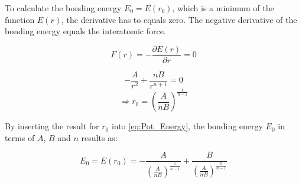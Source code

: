 To calculate the bonding energy $E_0 = E(r_0)$, which is a minimum of the function $E(r)$,
the derivative has to equals zero.
The negative derivative of the bonding energy equals the interatomic force.

$$F(r) = - \frac{\partial E(r)}{\partial r} = 0$$

$$-\frac{A}{r^2} + \frac{nB}{r^{n+1}} = 0$$
$$\Rightarrow r_0 = \left( \frac{A}{nB} \right)^{\frac{1}{n-1}}$$

By inserting the result for $r_0$ into \autoref{eq:Pot_Energy}, the bonding energy $E_0$ in terms of $A$, $B$ and $n$ results as:

$$E_0 = E(r_0) = - \frac{A}{\left( \frac{A}{nB} \right)^{\frac{1}{n-1}}} + 
				\frac{B}{\left( \frac{A}{nB} \right)^{\frac{n}{n-1}}}$$